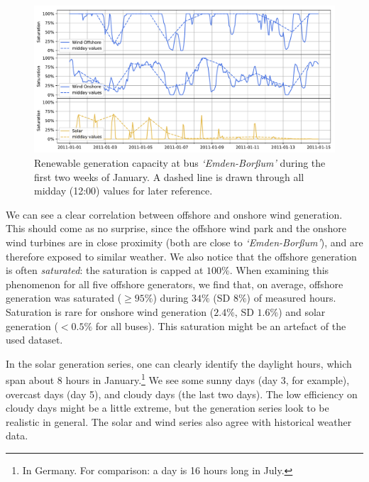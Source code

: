 \documentclass[main.tex]{subfiles}
\begin{document}
\begin{figure}[ht]
    \centering
    \includegraphics[width=\textwidth]{img/genseries270jan.pdf}
    \caption{Renewable generation capacity at bus \emph{`Emden-Borßum'} during the first two weeks of January. A dashed line is drawn through all midday (12:00) values for later reference.}\label{fig:genseries270jan}
\end{figure}

We can see a clear correlation between offshore and onshore wind generation. This should come as no surprise, since the offshore wind park and the onshore wind turbines are in close proximity (both are close to \emph{`Emden-Borßum'}), and are therefore exposed to similar weather. We also notice that the offshore generation is often \emph{saturated}: the saturation is capped at $100\si{\percent}$. When examining this phenomenon for all five offshore generators, we find that, on average, offshore generation was saturated ($\geq 95 \si{\percent}$) during $34\si{\percent}$ (SD $8\si{\percent}$) of measured hours. Saturation is rare for onshore wind generation ($2.4\si{\percent}$, SD $1.6\si{\percent}$) and solar generation ($< 0.5\si{\percent}$ for all buses). This saturation might be an artefact of the used dataset.

In the solar generation series, one can clearly identify the daylight hours, which span about 8 hours in January.\footnote{In Germany. For comparison: a day is 16 hours long in July.} We see some sunny days (day 3, for example), overcast days (day 5), and cloudy days (the last two days). The low efficiency on cloudy days might be a little extreme, but the generation series look to be realistic in general. The solar and wind series also agree with historical weather data.

\end{document}
